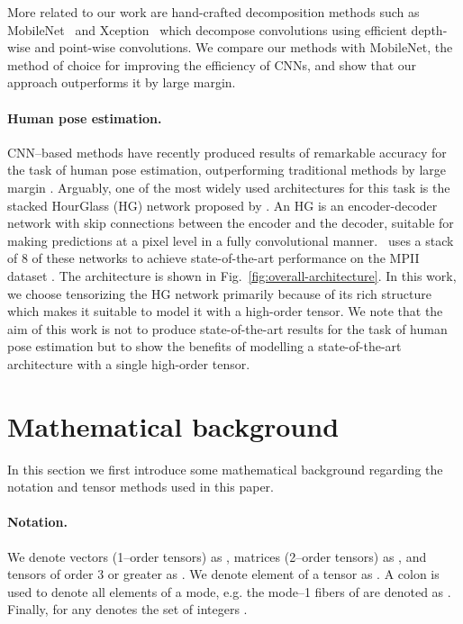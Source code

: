 \documentclass[10pt,twocolumn,letterpaper]{article}
\begin{document}
More related to our work are hand-crafted decomposition methods such as MobileNet~\cite{howard2017mobilenets} and Xception~\cite{chollet2017xception} which decompose  convolutions using efficient depth-wise and point-wise convolutions. We compare our methods with MobileNet, the method of choice for improving the efficiency of CNNs, and show that our approach outperforms it by large margin. 

\paragraph{Human pose estimation.} CNN--based methods have recently produced results of remarkable accuracy for the task of human pose estimation, outperforming traditional methods by large margin \cite{toshev2014deeppose,tompson2014joint,pfister2015flowing, bulat2016human,newell2016stacked, wei2016convolutional}. Arguably, one of the most widely used architectures for this task is the stacked HourGlass (HG) network proposed by \cite{newell2016stacked}. An HG is an encoder-decoder network with skip connections between the encoder and the decoder, suitable for making predictions at a pixel level in a fully convolutional manner. \cite{newell2016stacked}~uses a stack of 8 of these networks to achieve state-of-the-art performance on the MPII dataset \cite{andriluka20142d}. The architecture is shown in Fig.~\ref{fig:overall-architecture}. In this work, we choose tensorizing the HG network primarily because of its rich structure which makes it suitable to model it with a high-order tensor. We note that the aim of this work is not to produce state-of-the-art results for the task of human pose estimation but to show the benefits of modelling a state-of-the-art architecture with a single high-order tensor. 



 \section{Mathematical background}\label{sec:math-background}

In this section we first introduce some mathematical background regarding the notation and tensor methods used in this paper.

\paragraph{Notation.} We denote vectors (1\myst--order tensors) as , matrices (2\mynd--order tensors) as , and tensors of order 3 or greater as   . We denote element  of a tensor as . A colon is used to denote all elements of a mode, e.g. the mode--1 fibers of  are denoted as . 
Finally, for any  denotes the set of integers .
\end{document}
